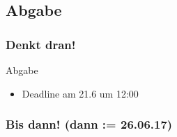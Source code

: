 \documentclass[18pt]{beamer}
\begin{document}
	\subsection{Abgabe}
	\begin{frame}
		\frametitle{Denkt dran!}
		\begin{alertblock}{Abgabe}
			\begin{itemize}
				\item Deadline am 21.6 um 12:00 %
			\end{itemize}
		\end{alertblock}
	\end{frame}
		
	\begin{frame}
		\frametitle{Bis dann! (dann  := 26.06.17)}
		\centering
	\end{frame}
\end{document}
